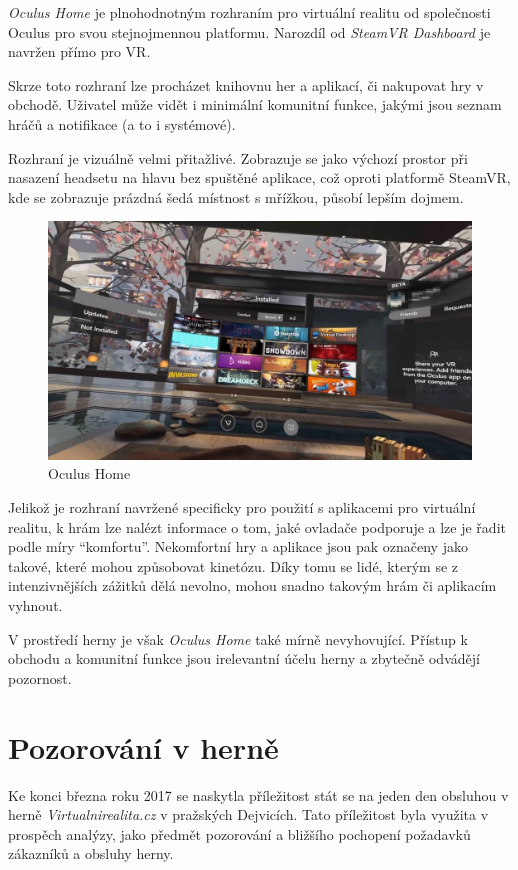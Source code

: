 \emph{Oculus Home} je plnohodnotným rozhraním pro virtuální realitu od
společnosti Oculus pro svou stejnojmennou platformu. Narozdíl od
\emph{SteamVR Dashboard} je navržen přímo pro VR.

Skrze toto rozhraní lze procházet knihovnu her a aplikací, či nakupovat hry v
obchodě. Uživatel může vidět i minimální komunitní funkce, jakými jsou
seznam hráčů a notifikace (a to i systémové).

Rozhraní je vizuálně velmi přitažlivé. Zobrazuje se jako výchozí prostor
při nasazení headsetu na hlavu bez spuštěné aplikace, což oproti platformě
SteamVR, kde se zobrazuje prázdná šedá místnost s mřížkou, působí lepším
dojmem.

\begin{figure}[h!]
\centering
\includegraphics[width=12cm]{src/assets/oculus-home.jpg}
\caption{Oculus Home}
\end{figure}

Jelikož je rozhraní navržené specificky pro použití s aplikacemi pro
virtuální realitu, k hrám lze nalézt informace o tom, jaké ovladače
podporuje a lze je řadit podle míry ``komfortu''. Nekomfortní hry a aplikace jsou
pak označeny jako takové, které mohou způsobovat kinetózu. Díky tomu se
lidé, kterým se z intenzivnějších zážitků dělá nevolno, mohou snadno takovým
hrám či aplikacím vyhnout.

V prostředí herny je však \emph{Oculus Home} také mírně nevyhovující.
Přístup k obchodu a komunitní funkce jsou irelevantní účelu herny a
zbytečně odvádějí pozornost.

\section{Pozorování v herně}\label{pozorovuxe1nuxed-v-hernux11b}

Ke konci března roku 2017 se naskytla příležitost stát se na jeden den
obsluhou v herně \emph{Virtualnirealita.cz} v pražských Dejvicích. Tato
příležitost byla využita v prospěch analýzy, jako předmět pozorování a
bližšího pochopení požadavků zákazníků a obsluhy herny.

